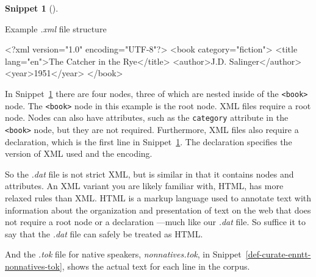 \documentclass[
  letterpaper,
  krantz1]{latex/krantz-mod}
\newenvironment{Shaded}{\begin{snugshade}}{\end{snugshade}}
\newcommand{\FunctionTok}[1]{\textcolor[rgb]{0.00,0.00,0.00}{#1}}
\newcommand{\KeywordTok}[1]{\textcolor[rgb]{0.00,0.00,0.00}{#1}}
\newcommand{\NormalTok}[1]{\textcolor[rgb]{0.00,0.00,0.00}{#1}}
\newcommand{\OtherTok}[1]{\textcolor[rgb]{0.00,0.00,0.00}{#1}}
\newcommand{\StringTok}[1]{\textcolor[rgb]{0.00,0.00,0.00}{#1}}
\theoremstyle{definition}
\newtheorem{definition}{Snippet}[chapter]
\theoremstyle{definition}
\theoremstyle{remark}
\begin{document}
\begin{definition}[]\protect\hypertarget{def-curate-xml}{}\label{def-curate-xml}

Example \emph{.xml} file structure

\begin{Shaded}
\begin{Highlighting}[]
\FunctionTok{\textless{}?xml}\OtherTok{ version=}\StringTok{"1.0"}\OtherTok{ encoding=}\StringTok{"UTF{-}8"}\FunctionTok{?\textgreater{}}
\NormalTok{\textless{}}\KeywordTok{book}\OtherTok{ category=}\StringTok{"fiction"}\NormalTok{\textgreater{}}
\NormalTok{  \textless{}}\KeywordTok{title}\OtherTok{ lang=}\StringTok{"en"}\NormalTok{\textgreater{}The Catcher in the Rye\textless{}/}\KeywordTok{title}\NormalTok{\textgreater{}}
\NormalTok{  \textless{}}\KeywordTok{author}\NormalTok{\textgreater{}J.D. Salinger\textless{}/}\KeywordTok{author}\NormalTok{\textgreater{}}
\NormalTok{  \textless{}}\KeywordTok{year}\NormalTok{\textgreater{}1951\textless{}/}\KeywordTok{year}\NormalTok{\textgreater{}}
\NormalTok{\textless{}/}\KeywordTok{book}\NormalTok{\textgreater{}}
\end{Highlighting}
\end{Shaded}

\end{definition}

In Snippet~\ref{def-curate-xml} there are four nodes, three of which are
nested inside of the \texttt{\textless{}book\textgreater{}} node. The
\texttt{\textless{}book\textgreater{}} node in this example is the root
node. XML files require a root
node. Nodes can also have
attributes, such as the \texttt{category} attribute in the
\texttt{\textless{}book\textgreater{}} node, but they are not required.
Furthermore, XML files also require a declaration, which is the first
line in Snippet~\ref{def-curate-xml}. The declaration specifies the
version of XML used and the encoding.

So the \emph{.dat} file is not strict XML, but is similar in that it
contains nodes and attributes. An XML variant you are likely familiar
with, HTML, has more relaxed
rules than XML. HTML is a markup language used to annotate text with
information about the organization and presentation of text on the web
that does not require a root node or a declaration ---much like our
\emph{.dat} file. So suffice it to say that the \emph{.dat} file can
safely be treated as HTML.

And the \emph{.tok} file for native speakers, \emph{nonnatives.tok}, in
Snippet~\ref{def-curate-enntt-nonnatives-tok}, shows the actual text for
each line in the corpus.
\end{document}
